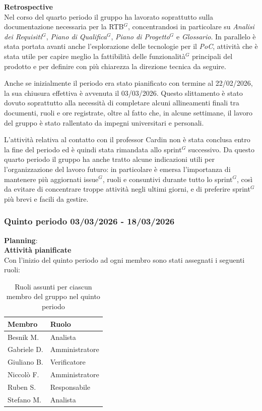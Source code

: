 \documentclass[a4paper,10pt]{article}
\begin{document}
\textbf{Retrospective} \\
Nel corso del quarto periodo il gruppo ha lavorato soprattutto sulla documentazione necessaria per la RTB$^G$, concentrandosi in particolare su \textit{Analisi dei Requisiti$^G$}, \textit{Piano di Qualifica$^G$}, \textit{Piano di Progetto$^G$} e \textit{Glossario}. In parallelo è stata portata avanti anche l'esplorazione delle tecnologie per il \textit{PoC}, attività che è stata utile per capire meglio la fattibilità delle funzionalità$^G$ principali del prodotto e per definire con più chiarezza la direzione tecnica da seguire.

Anche se inizialmente il periodo era stato pianificato con termine al 22/02/2026, la sua chiusura effettiva è avvenuta il 03/03/2026. Questo slittamento è stato dovuto soprattutto alla necessità di completare alcuni allineamenti finali tra documenti, ruoli e ore registrate, oltre al fatto che, in alcune settimane, il lavoro del gruppo è stato rallentato da impegni universitari e personali.

L'attività relativa al contatto con il professor Cardin non è stata conclusa entro la fine del periodo ed è quindi stata rimandata allo sprint$^G$ successivo. Da questo quarto periodo il gruppo ha anche tratto alcune indicazioni utili per l'organizzazione del lavoro futuro: in particolare è emersa l'importanza di mantenere più aggiornati issue$^G$, ruoli e consuntivi durante tutto lo sprint$^G$, così da evitare di concentrare troppe attività negli ultimi giorni, e di preferire sprint$^G$ più brevi e facili da gestire.



\subsubsection{Quinto periodo 03/03/2026 - 18/03/2026}
\textbf{Planning}: \\
\textbf{Attività pianificate} \\ Con l'inizio del quinto periodo ad ogni membro sono stati assegnati i seguenti ruoli:
\begin{table}[H]
\centering
\begin{tabular}{|l|l|}
\hline
\textbf{Membro} & \textbf{Ruolo} \\
\hline
Besnik M.  & Analista \\
\hline
Gabriele D.  & Amministratore \\
\hline
Giuliano B. & Verificatore \\
\hline
Niccolò F. & Amministratore \\
\hline
Ruben S. & Responsabile \\
\hline
Stefano M.  & Analista \\
\hline
\end{tabular}
\caption{Ruoli assunti per ciascun membro del gruppo nel quinto periodo}
\end{table}
\end{document}
